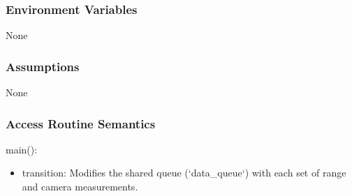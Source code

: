 \documentclass[12pt, titlepage]{article}
\begin{document}
\subsubsection{Environment Variables}
None

\subsubsection{Assumptions}
None
  
\subsubsection{Access Routine Semantics} \label{main_code}

\noindent main():
\begin{itemize}
\item transition: Modifies the shared queue (`data\_queue`) with each set of range and camera measurements.
\end{itemize}
\end{document}
